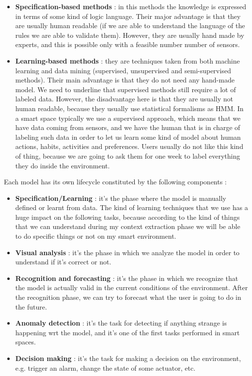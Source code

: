 \documentclass[11pt]{article}
\begin{document}
\begin{itemize}
\item \textbf{Specification-based methods} : in this methods the knowledge is expressed in terms of some kind of logic language. Their major advantage is that they are usually human readable (if we are able to understand the language of the rules we are able to validate them). However, they are usually hand made by experts, and this is possible only with a feasible number number of sensors.

\item \textbf{Learning-based methods} : they are techniques taken from both machine learning and data mining (supervised, unsupervised and semi-supervised methods). Their main advantage is that they do not need any hand-made model. We need to underline that supervised methods still require a lot of labeled data. However, the disadvantage here is that they are usually not human readable, because they usually use statistical formalisms as HMM. In a smart space typically we use a supervised approach, which means that we have data coming from sensors, and we have the human that is in charge of labeling such data in order to let us learn some kind of model about human actions, habits, activities and preferences. Users usually do not like this kind of thing, because we are going to ask them for one week to label everything they do inside the environment. 
\end{itemize}

Each model has its own lifecycle constituted by the following components :

\begin{itemize}
\item \textbf{Specification/Learning} : it's the phase where the model is manually defined or learnt from data. The kind of learning techniques that we use has a huge impact on the following tasks, because according to the kind of things that we can understand during my context extraction phase we will be able to do specific things or not on my smart environment.

\item \textbf{Visual analysis} : it's the phase in which we analyze the model in order to understand if it's correct or not.

\item \textbf{Recognition and forecasting} : it's the phase in which we recognize that the model is actually valid in the current conditions of the environment. After the recognition phase, we can try to forecast what the user is going to do in the future.

\item \textbf{Anomaly detection} : it's the task for detecting if anything strange is happening wrt the model, and it's one of the first tasks performed in smart spaces.

\item \textbf{Decision making} : it's the task for making a decision on the environment, e.g. trigger an alarm, change the state of some actuator, etc.
\end{itemize}
\end{document}
